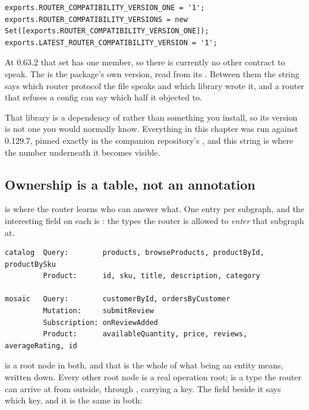 \begin{verbatim}
exports.ROUTER_COMPATIBILITY_VERSION_ONE = '1';
exports.ROUTER_COMPATIBILITY_VERSIONS = new Set([exports.ROUTER_COMPATIBILITY_VERSION_ONE]);
exports.LATEST_ROUTER_COMPATIBILITY_VERSION = '1';
\end{verbatim}

At 0.63.2 that set has one member, so there is currently no other contract to
speak. The  is the package's own version, read from its
. Between them the string says which router protocol the file
speaks and which library wrote it, and a router that refuses a config can say
which half it objected to.

That library is a dependency of  rather than something you install, so
its version is not one you would normally know. Everything in this chapter was
run against  0.129.7, pinned exactly in the companion repository's
, and this string is where the number underneath it becomes
visible.

\subsection*{Ownership is a table, not an annotation}

%
 is where the router learns who can
answer what. One entry per subgraph, and the interesting field on each is
: the types the router is allowed to \emph{enter} that subgraph
at.

\begin{verbatim}
catalog  Query:        products, browseProducts, productById, productBySku
         Product:      id, sku, title, description, category

mosaic   Query:        customerById, ordersByCustomer
         Mutation:     submitReview
         Subscription: onReviewAdded
         Product:      availableQuantity, price, reviews, averageRating, id
\end{verbatim}

%
 is a root node in both, and that is the whole of what being an
entity means, written down. Every other root node is a real operation root;
 is a type the router can arrive at from outside, through
, carrying a key. The  field beside it says which
key, and it is the same in both:

